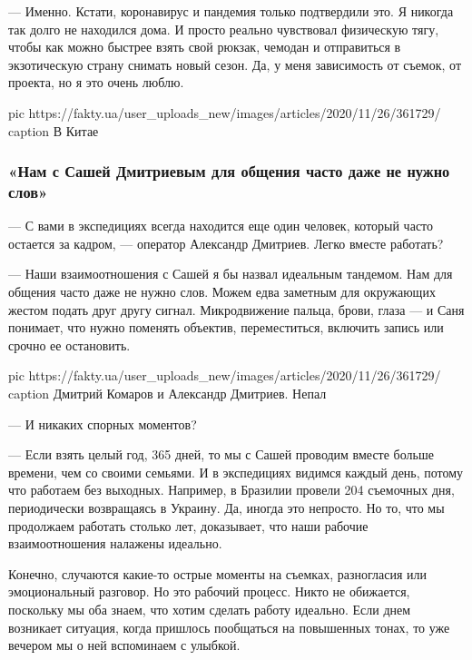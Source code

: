 — Именно. Кстати, коронавирус и пандемия только подтвердили это. Я никогда
так долго не находился дома. И просто реально чувствовал физическую тягу,
чтобы как можно быстрее взять свой рюкзак, чемодан и отправиться
в экзотическую страну снимать новый сезон. Да, у меня зависимость
от съемок, от проекта, но я это очень люблю.

\ifcmt
pic https://fakty.ua/user_uploads_new/images/articles/2020/11/26/361729/%
caption  В Китае
\fi

\subsubsection{«Нам с Сашей Дмитриевым для общения часто даже не нужно слов»}

— С вами в экспедициях всегда находится еще один человек, который часто
остается за кадром, — оператор Александр Дмитриев. Легко вместе работать?

— Наши взаимоотношения с Сашей я бы назвал идеальным тандемом. Нам для
общения часто даже не нужно слов. Можем едва заметным для окружающих
жестом подать друг другу сигнал. Микродвижение пальца, брови, глаза —
и Саня понимает, что нужно поменять объектив, переместиться, включить
запись или срочно ее остановить.

\ifcmt
pic https://fakty.ua/user_uploads_new/images/articles/2020/11/26/361729/%
caption  Дмитрий Комаров и Александр Дмитриев. Непал
\fi

— И никаких спорных моментов?

— Если взять целый год, 365 дней, то мы с Сашей проводим вместе больше
времени, чем со своими семьями. И в экспедициях видимся каждый день,
потому что работаем без выходных. Например, в Бразилии провели 204
съемочных дня, периодически возвращаясь в Украину. Да, иногда это
непросто. Но то, что мы продолжаем работать столько лет, доказывает, что
наши рабочие взаимоотношения налажены идеально.

Конечно, случаются какие-то острые моменты на съемках, разногласия или
эмоциональный разговор. Но это рабочий процесс. Никто не обижается,
поскольку мы оба знаем, что хотим сделать работу идеально. Если днем
возникает ситуация, когда пришлось пообщаться на повышенных тонах, то уже
вечером мы о ней вспоминаем с улыбкой.

